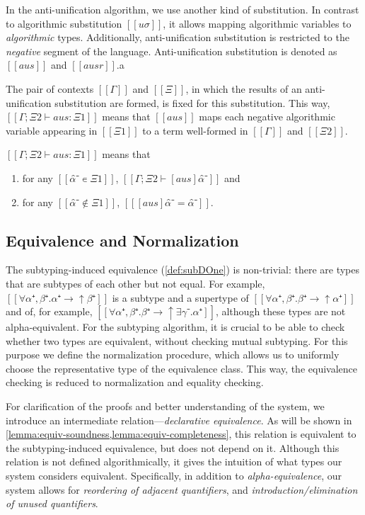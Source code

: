\documentclass[acmsmall,natbib=false,review,anonymous]{acmart}
\begin{document}
In the anti-unification algorithm, we use another kind of substitution.
In contrast to algorithmic substitution $[[uσ]]$,
it allows mapping algorithmic variables to
\emph{algorithmic} types.
Additionally, anti-unification substitution is restricted to the
\emph{negative} segment of the language.
Anti-unification substitution is denoted as $[[aus]]$ and $[[ausr]]$.a

The pair of contexts $[[Γ]]$ and $[[Ξ]]$,
in which the results of an anti-unification substitution 
are formed, is fixed for this substitution.
This way, $[[Γ; Ξ2 ⊢ aus : Ξ1]]$ means that $[[aus]]$ maps each negative algorithmic
variable appearing in $[[Ξ1]]$ to a term well-formed in $[[Γ]]$ and $[[Ξ2]]$.

\begin{definition}
  $[[Γ; Ξ2 ⊢ aus : Ξ1]]$ means that
  \begin{enumerate}
    \item for any $[[ α̂⁻ ∊ Ξ1]]$, $[[ Γ; Ξ2 ⊢ [aus]α̂⁻ ]]$ and
    \item for any $[[ α̂⁻ ∉ Ξ1]]$, $[[ [aus]α̂⁻ = α̂⁻ ]]$.
  \end{enumerate}
\end{definition}

\subsection{Equivalence and Normalization}
\label{sec:equivalence-normalization}

The subtyping-induced equivalence (\cref{def:subDOne}) is non-trivial:
there are types that are subtypes of each other but not equal. 
For example, $[[∀α⁺,β⁺.α⁺ → ↑β⁺]]$ is a subtype and a supertype of $[[∀α⁺,β⁺.β⁺ → ↑α⁺]]$
and of, for example, $[[∀α⁺,β⁺.β⁺ → ↑∃γ⁻.α⁺]]$, 
although these types are not alpha-equivalent.
For the subtyping algorithm, it is crucial to be able to check whether
two types are equivalent, without checking mutual subtyping. 
For this purpose we define the normalization procedure, 
which allows us to uniformly choose the representative type of the equivalence class.
This way, the equivalence checking is reduced to normalization and equality checking. 

For clarification of the proofs and better understanding of the system, 
we introduce an intermediate relation---\emph{declarative equivalence}. 
As will be shown in \cref{lemma:equiv-soundness,lemma:equiv-completeness}, 
this relation is equivalent to the subtyping-induced equivalence, but does not 
depend on it. Although this relation is not defined algorithmically, 
it gives the intuition of what types our system considers equivalent.
Specifically, in addition to \emph{alpha-equivalence}, 
our system allows for \emph{reordering of adjacent quantifiers},
and \emph{introduction/elimination of unused quantifiers}.
\end{document}

